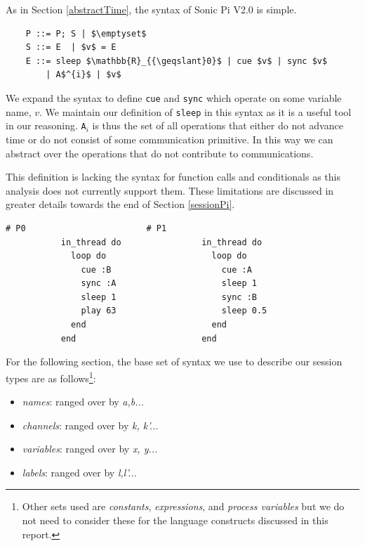 \documentclass[11pt, abstracton, twoside, titlepage=true]{scrartcl}
\begin{document}
As in Section \ref{abstractTime}, the syntax of Sonic Pi V2.0 is simple.
\\
\begin{lstlisting}
	P ::= P; S | $\emptyset$
	S ::= E  | $v$ = E
	E ::= sleep $\mathbb{R}_{{\geqslant}0}$ | cue $v$ | sync $v$ 
	    | A$^{i}$ | $v$
\end{lstlisting}

We expand the syntax to define \texttt{cue} and \texttt{sync} which operate on
some variable name, $v$. We maintain our definition of \texttt{sleep} in this syntax 
as it is a useful tool in our reasoning. \texttt{A$_{i}$} is thus the set of all 
operations that either do not advance time or do not consist of some communication
primitive. In this way we can abstract over the operations that do not contribute 
to communications.

This definition is lacking the syntax for function calls and conditionals as this 
analysis does not currently support them. These limitations are discussed in greater 
details towards the end of Section \ref{sessionPi}.

\begin{minipage}{\textwidth}
	\begin{lstlisting}[style = sonicpi]
           # P0                        # P1
           in_thread do                in_thread do 
             loop do                     loop do
               cue :B                      cue :A 
               sync :A                     sleep 1
               sleep 1                     sync :B
               play 63                     sleep 0.5
             end                         end
           end                         end
	\end{lstlisting}
	 \label{formTypes}
\end{minipage}

For the following section, the base set of syntax we use to describe our session
types are as follows\footnote{Other sets used are \emph{constants}, 
\emph{expressions}, and \emph{process variables} but we do not need to consider 
these for the language constructs discussed in this report.}:

\begin{itemize}[noitemsep]
  \item[] \emph{names}: ranged over by \emph{a,b...}
  \item[] \emph{channels}: ranged over by \emph{k, k'...}
  \item[] \emph{variables}: ranged over by \emph{x, y...}
  \item[] \emph{labels}: ranged over by \emph{l,l'...}
\end{itemize}
\end{document}
